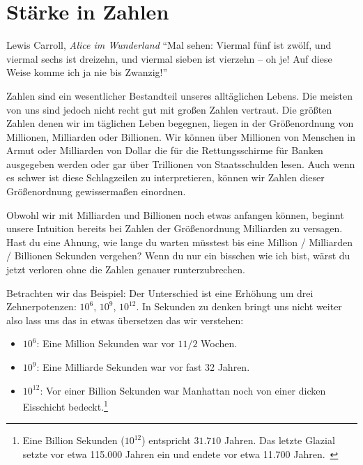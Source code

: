 \chapter{Stärke in Zahlen}
\label{les:15}

\begin{chapquote}{Lewis Carroll, \textit{Alice im Wunderland}}
\enquote{Mal sehen: Viermal fünf ist zwölf, und viermal sechs ist dreizehn, und
viermal sieben ist vierzehn – oh je! Auf diese Weise komme ich ja nie bis
Zwanzig!}
\end{chapquote}

Zahlen sind ein wesentlicher Bestandteil unseres alltäglichen Lebens. Die
meisten von uns sind jedoch nicht recht gut mit großen Zahlen vertraut. Die
größten Zahlen denen wir im täglichen Leben begegnen, liegen in der
Größenordnung von Millionen, Milliarden oder Billionen. Wir können über
Millionen von Menschen in Armut oder Milliarden von Dollar die für die
Rettungsschirme für Banken ausgegeben werden oder gar über Trillionen von
Staatsschulden lesen. Auch wenn es schwer ist diese Schlagzeilen zu
interpretieren, können wir Zahlen dieser Größenordnung gewissermaßen einordnen.

Obwohl wir mit Milliarden und Billionen noch etwas anfangen können, beginnt
unsere Intuition bereits bei Zahlen der Größenordnung Milliarden zu versagen.
Hast du eine Ahnung, wie lange du warten müsstest bis eine Million / Milliarden
/ Billionen Sekunden vergehen? Wenn du nur ein bisschen wie ich bist, wärst du
jetzt verloren ohne die Zahlen genauer runterzubrechen.

Betrachten wir das Beispiel: Der Unterschied ist eine Erhöhung um drei
Zehnerpotenzen: $10^6$, $10^9$, $10^{12}$. In Sekunden zu denken bringt uns
nicht weiter also lass uns das in etwas übersetzen das wir verstehen:

\begin{itemize}
  \item $10^6$: Eine Million Sekunden war vor $1 1/2$ Wochen.
  \item $10^9$: Eine Milliarde Sekunden war vor fast 32 Jahren.
  \item $10^{12}$: Vor einer Billion Sekunden war Manhattan noch von einer
  dicken Eisschicht bedeckt.\footnote{Eine Billion Sekunden ($10^{12}$)
  entspricht $31.710$ Jahren. Das letzte Glazial setzte vor etwa 115.000 Jahren
  ein und endete vor etwa 11.700 Jahren.~\cite{wiki:LGM}}
\end{itemize}

